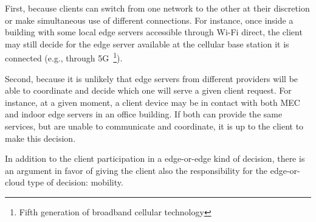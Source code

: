 %
%
%

First, because clients can switch from one network to the other at their discretion or make simultaneous use of different connections. For instance, once inside a building with some local edge servers accessible through Wi-Fi direct, the client may still decide for the edge server available at the cellular base station it is connected (e.g., through 5G~\footnote{Fifth generation of broadband cellular technology}). 

Second, because it is unlikely that edge servers from different providers will be able to coordinate and decide which one will serve a given client request. For instance, at a given moment, a client device may be in contact with both MEC and indoor edge servers in an office building. If both can provide the same services, but are unable to communicate and coordinate, it is up to the client to make this decision.




In addition to the client participation in a edge-or-edge kind of decision, there is an argument in favor of giving the client also the responsibility for the edge-or-cloud type of decision: mobility. 

